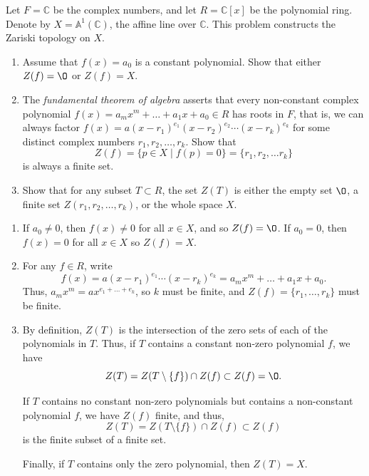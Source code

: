 \documentclass[12 pt, letterpaper]{hmcpset}
\begin{document}
\begin{problem}[Problem 1.]
	Let $F = \mathbb{C}$ be the complex numbers, and let $R = \mathbb{C}[x]$ be the polynomial ring. Denote by $X = \mathbb{A}^{1}(\mathbb{C})$, the affine line over $\mathbb{C}$. This problem constructs the Zariski topology on $X$.
	\begin{enumerate}
		\item Assume that $f(x) = a_{0}$ is a constant polynomial. Show that either $Z(f) = \O$ or $Z(f) = X$.
		\item The \emph{fundamental theorem of algebra} asserts that every non-constant complex polynomial $f(x) = a_{m} x^{m} + \dots + a_{1} x + a_{0} \in R$ has roots in $F$, that is, we can always factor $f(x) = a(x - r_{1})^{e_{1}} (x - r_{2})^{e_{2}} \cdots (x - r_{k})^{e_{k}}$ for some distinct complex numbers $r_{1}, r_{2}, \dots, r_{k}$. Show that
			\[
				Z(f) = \{ p \in X \mid f(p) = 0 \} = \{ r_{1}, r_{2}, \dots r_{k} \}
			\]
			is always a finite set.
		\item Show that for any subset $T \subset R$, the set $Z(T)$ is either the empty set $\O$, a finite set $Z(r_{1}, r_{2}, \dots, r_{k})$, or the whole space $X$.
	\end{enumerate}
\end{problem}

\begin{solution}
	\begin{enumerate}
		\item If $a_{0} \neq 0$, then $f(x) \neq 0$ for all $x \in X$, and so $Z(f) = \O$. If $a_{0} = 0$, then $f(x) = 0$ for all $x \in X$ so $Z(f) = X$.
		\item For any $f \in R$, write
			\[
				f(x) = a (x - r_{1})^{e_{1}} \cdots (x - r_{k})^{e_{k}} = a_{m} x^{m} + \dots + a_{1} x + a_{0}.
			\]
			Thus, $a_{m} x^{m} = a x^{e_{1} + \dots + e_{k}}$, so $k$ must be finite, and $Z(f) = \{ r_{1}, \dots, r_{k} \}$ must be finite.
		\item By definition, $Z(T)$ is the intersection of the zero sets of each of the polynomials in $T$. Thus, if $T$ contains a constant non-zero polynomial $f$, we have
			 \[
				Z(T) = Z(T \setminus \{ f \}) \cap Z(f) \subset Z(f) = \O.
			\]

			If $T$ contains no constant non-zero polynomials but contains a non-constant polynomial $f$, we have $Z(f)$ finite, and thus,
			\[
				Z(T) = Z(T \setminus \{ f \}) \cap Z(f) \subset Z(f)
			\]
			is the finite subset of a finite set.

			Finally, if $T$ contains only the zero polynomial, then $Z(T) = X$.
	\end{enumerate}
\end{solution}
\end{document}

